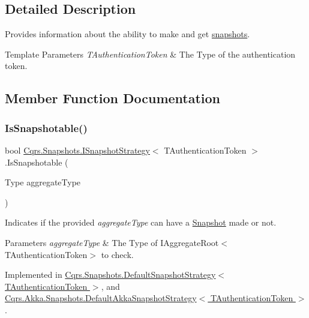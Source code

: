 \subsection{Detailed Description}
Provides information about the ability to make and get \hyperlink{classCqrs_1_1Snapshots_1_1Snapshot}{snapshots}. 


\begin{DoxyTemplParams}{Template Parameters}
{\em T\+Authentication\+Token} & The Type of the authentication token.\\
\hline
\end{DoxyTemplParams}


\subsection{Member Function Documentation}
\mbox{\label{interfaceCqrs_1_1Snapshots_1_1ISnapshotStrategy_a02121821312c4ce2811b31eeaffabe51_a02121821312c4ce2811b31eeaffabe51}} 
\subsubsection{\texorpdfstring{Is\+Snapshotable()}{IsSnapshotable()}}
{\footnotesize\ttfamily bool \hyperlink{interfaceCqrs_1_1Snapshots_1_1ISnapshotStrategy}{Cqrs.\+Snapshots.\+I\+Snapshot\+Strategy}$<$ T\+Authentication\+Token $>$.Is\+Snapshotable (\begin{DoxyParamCaption}\item[{Type}]{aggregate\+Type }\end{DoxyParamCaption})}



Indicates if the provided {\itshape aggregate\+Type}  can have a \hyperlink{classCqrs_1_1Snapshots_1_1Snapshot}{Snapshot} made or not. 


\begin{DoxyParams}{Parameters}
{\em aggregate\+Type} & The Type of I\+Aggregate\+Root$<$\+T\+Authentication\+Token$>$ to check.\\
\hline
\end{DoxyParams}


Implemented in \hyperlink{classCqrs_1_1Snapshots_1_1DefaultSnapshotStrategy_acdbb918ac01b526aedb5fa9a3879887a_acdbb918ac01b526aedb5fa9a3879887a}{Cqrs.\+Snapshots.\+Default\+Snapshot\+Strategy$<$ T\+Authentication\+Token $>$}, and \hyperlink{classCqrs_1_1Akka_1_1Snapshots_1_1DefaultAkkaSnapshotStrategy_ad7d9bb43fc53cf16a242510612f4c13e_ad7d9bb43fc53cf16a242510612f4c13e}{Cqrs.\+Akka.\+Snapshots.\+Default\+Akka\+Snapshot\+Strategy$<$ T\+Authentication\+Token $>$}.

